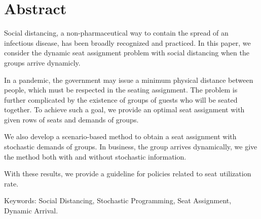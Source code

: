 
\section*{Abstract}
Social distancing, a non-pharmaceutical way to contain the spread of an infectious disease, has been broadly recognized and practiced. In this paper, we consider the dynamic seat assignment problem with social distancing when the groups arrive dynamicly.

In a pandemic, the government may issue a minimum physical distance between people, which must be respected in the seating assignment. The problem is further complicated by the existence of groups of guests who will be seated together. To achieve such a goal, we provide an optimal seat assignment with given rows of seats and demands of groups.

We also develop a scenario-based method to obtain a seat assignment with stochastic demands of groups. In business, the group arrives dynamically, we give the method both with and without stochastic information.

With these results, we provide a guideline for policies related to seat utilization rate.

Keywords: Social Distancing, Stochastic Programming, Seat Assignment, Dynamic Arrival.
